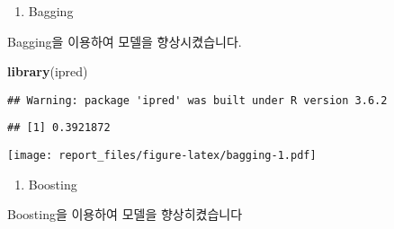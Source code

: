 \documentclass[]{article}
\newenvironment{Shaded}{\begin{snugshade}}{\end{snugshade}}
\newcommand{\DataTypeTok}[1]{\textcolor[rgb]{0.13,0.29,0.53}{#1}}
\newcommand{\DecValTok}[1]{\textcolor[rgb]{0.00,0.00,0.81}{#1}}
\newcommand{\KeywordTok}[1]{\textcolor[rgb]{0.13,0.29,0.53}{\textbf{#1}}}
\newcommand{\NormalTok}[1]{#1}
\newcommand{\OperatorTok}[1]{\textcolor[rgb]{0.81,0.36,0.00}{\textbf{#1}}}
\newcommand{\StringTok}[1]{\textcolor[rgb]{0.31,0.60,0.02}{#1}}
\providecommand{\tightlist}{%
  \setlength{\itemsep}{0pt}\setlength{\parskip}{0pt}}
\begin{document}
\begin{enumerate}
\def\labelenumi{\arabic{enumi})}
\tightlist
\item
  Bagging
\end{enumerate}

Bagging을 이용하여 모델을 향상시켰습니다.

\begin{Shaded}
\begin{Highlighting}[]
\KeywordTok{library}\NormalTok{(ipred)}
\end{Highlighting}
\end{Shaded}

\begin{verbatim}
## Warning: package 'ipred' was built under R version 3.6.2
\end{verbatim}

\begin{Shaded}
\end{Shaded}

\begin{verbatim}
## [1] 0.3921872
\end{verbatim}

\begin{Shaded}
\end{Shaded}

\texttt{[image: report\_files/figure-latex/bagging-1.pdf]}

\begin{enumerate}
\def\labelenumi{\arabic{enumi})}
\setcounter{enumi}{1}
\tightlist
\item
  Boosting
\end{enumerate}

Boosting을 이용하여 모델을 향상히켰습니다
\end{document}
